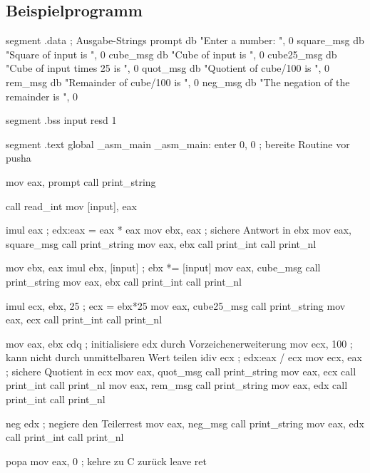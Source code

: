 \subsection{Beispielprogramm}
\begin{AsmCodeListing}[label=math.asm, numbers=left, commandchars=\\\{\}]
 segment .data                     ; Ausgabe-Strings
 prompt          db    "Enter a number: ", 0
 square_msg      db    "Square of input is ", 0
 cube_msg        db    "Cube of input is ", 0
 cube25_msg      db    "Cube of input times 25 is ", 0
 quot_msg        db    "Quotient of cube/100 is ", 0
 rem_msg         db    "Remainder of cube/100 is ", 0
 neg_msg         db    "The negation of the remainder is ", 0

 segment .bss
 input   resd    1

 segment .text
         global  _asm_main
 _asm_main:
         enter   0, 0              ; bereite Routine vor
         pusha

         mov     eax, prompt
         call    print_string

         call    read_int
         mov     [input], eax

         imul    eax               ; edx:eax = eax * eax
         mov     ebx, eax          ; sichere Antwort in ebx
         mov     eax, square_msg
         call    print_string
         mov     eax, ebx
         call    print_int
         call    print_nl

         mov     ebx, eax
         imul    ebx, [input]      ; ebx *= [input]
         mov     eax, cube_msg
         call    print_string
         mov     eax, ebx
         call    print_int
         call    print_nl

         imul    ecx, ebx, 25      ; ecx = ebx*25
         mov     eax, cube25_msg
         call    print_string
         mov     eax, ecx
         call    print_int
         call    print_nl

         mov     eax, ebx
         cdq                       ; initialisiere edx durch Vorzeichenerweiterung
         mov     ecx, 100          ; kann nicht durch unmittelbaren Wert teilen
         idiv    ecx               ; edx:eax / ecx
         mov     ecx, eax          ; sichere Quotient in ecx
         mov     eax, quot_msg
         call    print_string
         mov     eax, ecx
         call    print_int
         call    print_nl
         mov     eax, rem_msg
         call    print_string
         mov     eax, edx
         call    print_int
         call    print_nl

         neg     edx               ; negiere den Teilerrest
         mov     eax, neg_msg
         call    print_string
         mov     eax, edx
         call    print_int
         call    print_nl

         popa
         mov     eax, 0            ; kehre zu C zur\"{u}ck
         leave
         ret
\end{AsmCodeListing}


